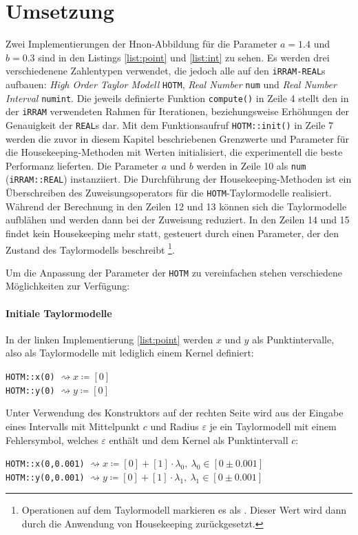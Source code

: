  \section{Umsetzung}
 \label{ch:umsetung}
 Zwei Implementierungen der H\e non-Abbildung für die Parameter $a=1.4$ und $b=0.3$ sind in den Listings \ref{list:point} und \ref{list:int} zu sehen. Es werden drei verschiedenene Zahlentypen verwendet, die jedoch alle auf den \verb+iRRAM-REAL+s aufbauen: \textit{High Order Taylor Modell} \verb+HOTM+, \textit{Real Number} \verb+num+ und \textit{Real Number Interval} \verb+numint+. Die jeweils definierte Funktion \verb+compute()+ in Zeile 4 stellt den in der \verb+iRRAM+ verwendeten Rahmen für Iterationen, beziehungsweise Erhöhungen der Genauigkeit der \verb+REAL+s dar. Mit dem Funktionsaufruf \verb+HOTM::init()+ in Zeile 7 werden die zuvor in diesem Kapitel beschriebenen Grenzwerte und Parameter für die Housekeeping-Methoden mit Werten initialisiert, die experimentell die beste Performanz lieferten. Die Parameter $a$ und $b$ werden in Zeile 10 als \verb+num+ (\verb+iRRAM::REAL+) instanziiert. Die Durchführung der Housekeeping-Methoden ist ein Überschreiben des Zuweisungsoperators \anf{=} für die \verb+HOTM+-Taylormodelle realisiert. Während der Berechnung in den Zeilen 12 und 13 können sich die Taylormodelle aufblähen und werden dann bei der Zuweisung reduziert. In den Zeilen 14 und 15 findet kein Housekeeping mehr statt, gesteuert durch einen Parameter, der den Zustand des Taylormodells beschreibt \footnote{Operationen auf dem Taylormodell markieren es als . Dieser Wert wird dann durch die Anwendung von Housekeeping zurückgesetzt.}.
 
 
 Um die Anpassung der Parameter der \verb+HOTM+ zu vereinfachen stehen verschiedene Möglichkeiten zur Verfügung:
 \paragraph{Initiale Taylormodelle}
 In der linken Implementierung \ref{list:point} werden $x$ und $y$ als Punktintervalle, also als Taylormodelle mit lediglich einem Kernel definiert:
  \begin{center}
  \verb+HOTM::x(0)+ $\rightsquigarrow x\coloneqq [0]$\\
  \verb+HOTM::y(0)+ $\rightsquigarrow y\coloneqq [0]$
 \end{center}

 
 Unter Verwendung des Konstruktors auf der rechten Seite wird aus der Eingabe eines Intervalls mit Mittelpunkt $c$ und Radius $\varepsilon$ je ein Taylormodell mit einem Fehlersymbol, welches $\varepsilon$ enthält und dem Kernel als Punktintervall $c$: 
 \begin{center}
  \verb+HOTM::x(0,0.001)+ $\rightsquigarrow x\coloneqq [0] + [1] \cdot \lambda_0,\ \lambda_0 \in [0 \pm 0.001]$\\
  \verb+HOTM::y(0,0.001)+ $\rightsquigarrow y\coloneqq[0] + [1] \cdot \lambda_1,\ \lambda_1 \in [0 \pm 0.001]$
 \end{center}

